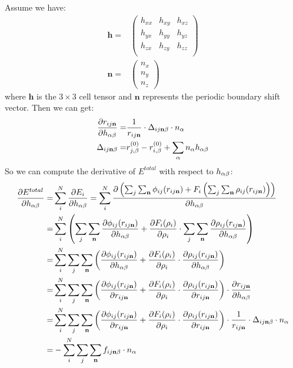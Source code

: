 \documentclass[prb,preprint]{revtex4-2}
\begin{document}
Assume we have:
\begin{align}
\mathbf{h} = & \begin{pmatrix}
    h_{xx} & h_{xy} & h_{xz} \\
    h_{yx} & h_{yy} & h_{yz} \\
    h_{zx} & h_{zy} & h_{zz} \\
\end{pmatrix} \\
\mathbf{n} = & \begin{pmatrix}
    n_{x} \\
    n_{y} \\
    n_{z}
\end{pmatrix}
\end{align}
where $\mathbf{h}$ is the $3 \times 3$ cell tensor and $\mathbf{n}$ represents
the periodic boundary shift vector. Then we can get:
\begin{align}
\frac{\partial r_{ij\mathbf{n}}}{\partial h_{\alpha\beta}} = &
    \frac{1}{r_{ij\mathbf{n}}} \cdot \Delta_{ij\mathbf{n}\beta} \cdot n_{\alpha} \\
\Delta_{ij\mathbf{n}\beta} = & r_{j,\beta}^{(0)} - r_{i,\beta}^{(0)} + 
    \sum_{\alpha}{n_{\alpha}h_{\alpha \beta}}
\end{align}
So we can compute the derivative of $E^{total}$ with respect to $h_{\alpha\beta}$:
\begin{align}
\frac{\partial E^{total}}{\partial h_{\alpha\beta}} = & \sum_{i}^N{
    \frac{\partial E_{i}}{\partial h_{\alpha\beta}}
} = 
\sum_{i}^{N}{\frac{\partial \left(
    \sum_{j}{\sum_{\mathbf{n}}
        \phi_{ij}(r_{ij\mathbf{n}})
    } + F_{i}\left( \sum_{j}{\sum_{\mathbf{n}}{
        \rho_{ij}(r_{ij\mathbf{n}})
    }} \right)
\right)}{\partial h_{\alpha\beta}}} \nonumber \\
= & \sum_{i}^{N}{\left(
    \sum_{j}{\sum_{\mathbf{n}}{
        \frac{\partial \phi_{ij}(r_{ij\mathbf{n}})}{\partial h_{\alpha\beta}}
    }} + \frac{\partial F_{i}(\rho_{i})}{\partial \rho_{i}} \cdot 
    \sum_{j}{\sum_{\mathbf{n}}{\frac{\partial \rho_{ij}(r_{ij\mathbf{n}})}{\partial h_{\alpha\beta}}}}
\right)} \nonumber \\
= & \sum_{i}^{N}{
    \sum_{j}{\sum_{\mathbf{n}}{\left(
        \frac{\partial \phi_{ij}(r_{ij\mathbf{n}})}{\partial h_{\alpha\beta}} +
        \frac{\partial F_{i}(\rho_{i})}{\partial \rho_{i}} \cdot 
        \frac{\partial \rho_{ij}(r_{ij\mathbf{n}})}{\partial h_{\alpha\beta}}
    \right)}}
} \nonumber \\
= & \sum_{i}^{N}{
    \sum_{j}{\sum_{\mathbf{n}}{\left(
        \frac{\partial \phi_{ij}(r_{ij\mathbf{n}})}{\partial r_{ij\mathbf{n}}} +
        \frac{\partial F_{i}(\rho_{i})}{\partial \rho_{i}} \cdot 
        \frac{\partial \rho_{ij}(r_{ij\mathbf{n}})}{\partial r_{ij\mathbf{n}}}
    \right) \cdot 
    \frac{\partial r_{ij\mathbf{n}}}{\partial h_{\alpha\beta}}
}}} \nonumber \\
= & \sum_{i}^{N}{
    \sum_{j}{\sum_{\mathbf{n}}{\left(
        \frac{\partial \phi_{ij}(r_{ij\mathbf{n}})}{\partial r_{ij\mathbf{n}}} +
        \frac{\partial F_{i}(\rho_{i})}{\partial \rho_{i}} \cdot 
        \frac{\partial \rho_{ij}(r_{ij\mathbf{n}})}{\partial r_{ij\mathbf{n}}}
    \right) \cdot 
    \frac{1}{r_{ij\mathbf{n}}} \cdot \Delta_{ij\mathbf{n}\beta} \cdot n_{\alpha}
}}} \nonumber \\
= & -\sum_{i}^{N}{
    \sum_{j}{\sum_{\mathbf{n}}{f_{ij\mathbf{n}\beta} \cdot n_{\alpha}
}}}
\end{align}
\end{document}
